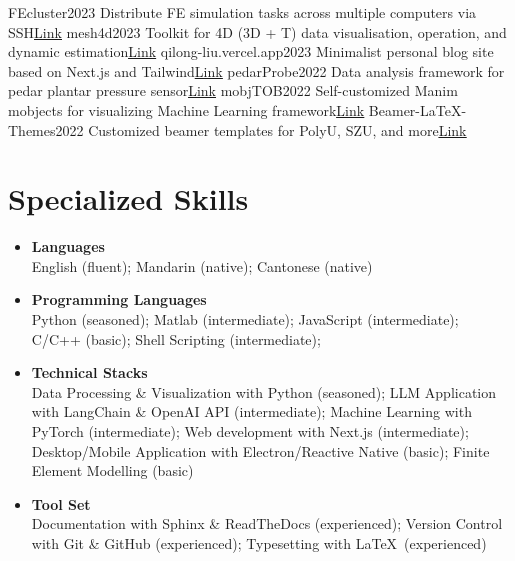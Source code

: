 \documentclass[letterpaper,11pt]{article}
\begin{document}
    \resumeSubHeadingListStart
        \resumeSubheading
            {FEcluster}{2023}
            {Distribute FE simulation tasks across multiple computers via SSH}{\href{https://github.com/TOB-KNPOB/FEcluster}{\underline{Link}}}
        \resumeSubheading
            {mesh4d}{2023}
            {Toolkit for 4D (3D + T) data visualisation, operation, and dynamic estimation}{\href{https://github.com/TOB-KNPOB/mesh4d}{\underline{Link}}}
        \resumeSubheading
            {qilong-liu.vercel.app}{2023}
            {Minimalist personal blog site based on Next.js and Tailwind}{\href{https://github.com/TOB-KNPOB/qilong-liu}{\underline{Link}}}
        \resumeSubheading
            {pedarProbe}{2022}
            {Data analysis framework for pedar plantar pressure sensor}{\href{https://github.com/TOB-KNPOB/pedarProbe}{\underline{Link}}}
        \resumeSubheading
            {mobjTOB}{2022}
            {Self-customized Manim mobjects for visualizing Machine Learning framework}{\href{https://github.com/TOB-KNPOB/mobjTOB}{\underline{Link}}}
        \resumeSubheading
            {Beamer-LaTeX-Themes}{2022}
            {Customized beamer templates for PolyU, SZU, and more}{\href{https://github.com/TOB-KNPOB/Beamer-LaTeX-Themes}{\underline{Link}}}
    \resumeSubHeadingListEnd

    \section{Specialized Skills}

    \begin{itemize}[leftmargin=0.15in, label={}, itemsep=0em]
        \item \textbf{Languages}\\
        English (fluent); Mandarin (native); Cantonese (native)
        \item \textbf{Programming Languages}\\
        Python (seasoned); Matlab (intermediate); JavaScript (intermediate); C/C++ (basic); Shell Scripting (intermediate);
        \item \textbf{Technical Stacks}\\
        Data Processing \& Visualization with Python (seasoned); LLM Application with LangChain \& OpenAI API (intermediate); Machine Learning with PyTorch (intermediate); Web development with Next.js (intermediate); Desktop/Mobile Application with Electron/Reactive Native (basic); Finite Element Modelling (basic)
        \item \textbf{Tool Set}\\
        Documentation with Sphinx \& ReadTheDocs (experienced); Version Control with Git \& GitHub (experienced); Typesetting with \LaTeX\ (experienced)
    \end{itemize}
\end{document}
